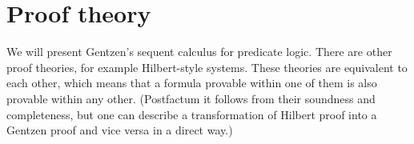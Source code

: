 

\setcounter{section}{2}
\setcounter{subsection}{1}
\setcounter{dfn}{0}

\section{Proof theory}
We will present Gentzen's sequent calculus for predicate logic.
There are other proof theories, for example Hilbert-style systems.
These theories are equivalent to each other, which means that a formula provable within one of them is also provable within any other.
(Postfactum it follows from their soundness and completeness,
but one can describe a transformation of Hilbert proof into a Gentzen proof and vice versa in a direct way.)



